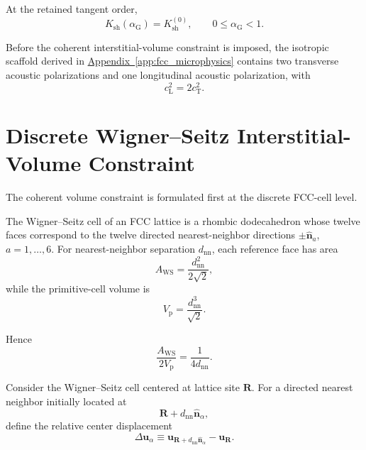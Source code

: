 At the retained tangent order,
\begin{equation}
    K_{\mathrm{sh}}(\alpha_{\mathrm{G}})
    =
    K_{\mathrm{sh}}^{(0)},
    \qquad
    0 \leq \alpha_{\mathrm{G}} < 1.
\end{equation}

Before the coherent interstitial-volume constraint is imposed, the isotropic scaffold derived in \hyperref[app:fcc_microphysics]{Appendix~\ref*{app:fcc_microphysics}} contains two transverse acoustic polarizations and one longitudinal acoustic polarization, with
\begin{equation}
    c_{\mathrm{L}}^2 = 2c_{\mathrm{T}}^2.
\end{equation}


\section{Discrete Wigner--Seitz Interstitial-Volume Constraint}
\label{sec:AP_discrete_volume_constraint}

The coherent volume constraint is formulated first at the discrete FCC-cell level.

The Wigner--Seitz cell of an FCC lattice is a rhombic dodecahedron whose twelve faces correspond to the twelve directed nearest-neighbor directions $\pm\hat{\mathbf{n}}_a$, $a=1,\ldots,6$. For nearest-neighbor separation $d_{\mathrm{nn}}$, each reference face has area
\begin{equation}
    A_{\mathrm{WS}}
    =
    \frac{d_{\mathrm{nn}}^2}{2\sqrt{2}},
\end{equation}
while the primitive-cell volume is
\begin{equation}
    V_{\mathrm{p}}
    =
    \frac{d_{\mathrm{nn}}^3}{\sqrt{2}}.
\end{equation}

Hence
\begin{equation}
    \frac{A_{\mathrm{WS}}}{2V_{\mathrm{p}}}
    =
    \frac{1}{4d_{\mathrm{nn}}}.
\end{equation}

Consider the Wigner--Seitz cell centered at lattice site $\mathbf{R}$. For a directed nearest neighbor initially located at
\begin{equation}
    \mathbf{R}
    +
    d_{\mathrm{nn}}\hat{\mathbf{n}}_{\alpha},
\end{equation}
define the relative center displacement
\begin{equation}
    \Delta\mathbf{u}_{\alpha}
    \equiv
    \mathbf{u}_{\mathbf{R}+d_{\mathrm{nn}}\hat{\mathbf{n}}_{\alpha}}
    -
    \mathbf{u}_{\mathbf{R}}.
\end{equation}

